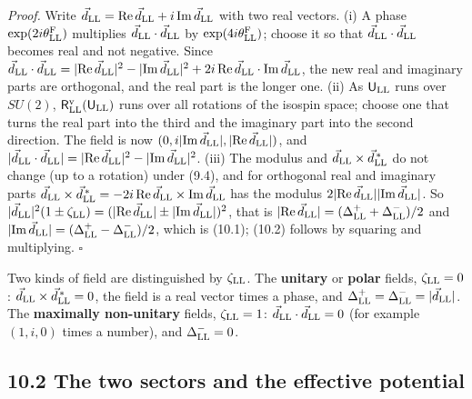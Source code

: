 \documentclass[
  10pt,
]{article}
\begin{document}
\emph{Proof.} Write
\(\vec d_{\rm LL}={\rm Re}\,\vec d_{\rm LL}+i\,{\rm Im}\,\vec d_{\rm LL}\)
with two real vectors. (i) A phase \(\exp(2i\theta^{\rm F}_{\rm LL})\)
multiplies \(\vec d_{\rm LL}\cdot\vec d_{\rm LL}\) by
\(\exp(4i\theta^{\rm F}_{\rm LL})\); choose it so that
\(\vec d_{\rm LL}\cdot\vec d_{\rm LL}\) becomes real and not negative.
Since
\(\vec d_{\rm LL}\cdot\vec d_{\rm LL}=\lvert{\rm Re}\,\vec d_{\rm LL}\rvert^2-\lvert{\rm Im}\,\vec d_{\rm LL}\rvert^2+2i\,{\rm Re}\,\vec d_{\rm LL}\cdot{\rm Im}\,\vec d_{\rm LL}\),
the new real and imaginary parts are orthogonal, and the real part is
the longer one. (ii) As \(\mathsf U_{\rm LL}\) runs over \(SU(2)\),
\(\mathsf R^{\rm v}_{\rm LL}(\mathsf U_{\rm LL})\) runs over all
rotations of the isospin space; choose one that turns the real part into
the third and the imaginary part into the second direction. The field is
now
\((0,i\lvert{\rm Im}\,\vec d_{\rm LL}\rvert,\lvert{\rm Re}\,\vec d_{\rm LL}\rvert)\),
and
\(\lvert\vec d_{\rm LL}\cdot\vec d_{\rm LL}\rvert=\lvert{\rm Re}\,\vec d_{\rm LL}\rvert^2-\lvert{\rm Im}\,\vec d_{\rm LL}\rvert^2\).
(iii) The modulus and \(\vec d_{\rm LL}\times\vec d^{\,*}_{\rm LL}\) do
not change (up to a rotation) under (9.4), and for orthogonal real and
imaginary parts
\(\vec d_{\rm LL}\times\vec d^{\,*}_{\rm LL}=-2i\,{\rm Re}\,\vec d_{\rm LL}\times{\rm Im}\,\vec d_{\rm LL}\)
has the modulus
\(2\lvert{\rm Re}\,\vec d_{\rm LL}\rvert\lvert{\rm Im}\,\vec d_{\rm LL}\rvert\).
So
\(\lvert\vec d_{\rm LL}\rvert^2(1\pm\zeta_{\rm LL})=(\lvert{\rm Re}\,\vec d_{\rm LL}\rvert\pm\lvert{\rm Im}\,\vec d_{\rm LL}\rvert)^2\),
that is
\(\lvert{\rm Re}\,\vec d_{\rm LL}\rvert=(\Delta^+_{\rm LL}+\Delta^-_{\rm LL})/2\)
and
\(\lvert{\rm Im}\,\vec d_{\rm LL}\rvert=(\Delta^+_{\rm LL}-\Delta^-_{\rm LL})/2\),
which is (10.1); (10.2) follows by squaring and multiplying. \(\square\)

Two kinds of field are distinguished by \(\zeta_{\rm LL}\). The
\textbf{unitary} or \textbf{polar} fields, \(\zeta_{\rm LL}=0\):
\(\vec d_{\rm LL}\times\vec d^{\,*}_{\rm LL}=0\), the field is a real
vector times a phase, and
\(\Delta^+_{\rm LL}=\Delta^-_{\rm LL}=\lvert\vec d_{\rm LL}\rvert\). The
\textbf{maximally non-unitary} fields, \(\zeta_{\rm LL}=1\):
\(\vec d_{\rm LL}\cdot\vec d_{\rm LL}=0\) (for example \((1,i,0)\) times
a number), and \(\Delta^-_{\rm LL}=0\).

\hypertarget{the-two-sectors-and-the-effective-potential}{%
\subsection{10.2 The two sectors and the effective
potential}\label{the-two-sectors-and-the-effective-potential}}
\end{document}
